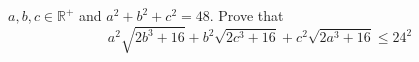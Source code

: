 $a,b,c\in\mathbb{R^+}$ and $a^2+b^2+c^2=48$. Prove that \[a^2\sqrt{2b^3+16}+b^2\sqrt{2c^3+16}+c^2\sqrt{2a^3+16}\le24^2\]